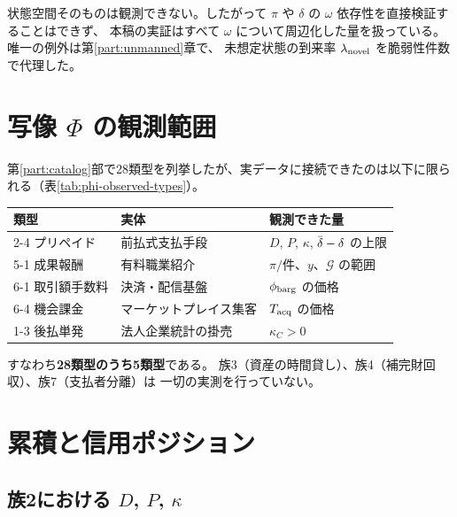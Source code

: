 \begin{remark}
状態空間そのものは観測できない。したがって
$\pi$ や $\delta$ の $\omega$ 依存性を直接検証することはできず、
本稿の実証はすべて $\omega$ について周辺化した量を扱っている。
唯一の例外は第\ref{part:unmanned}章で、
未想定状態の到来率 $\lambda_{\rm novel}$ を脆弱性件数で代理した。
\end{remark}

\section{写像 \texorpdfstring{$\Phi$}{Phi} の観測範囲}

第\ref{part:catalog}部で28類型を列挙したが、実データに接続できたのは以下に限られる（表\ref{tab:phi-observed-types}）。

\begin{center}
\begin{tabularx}{\textwidth}{@{}llX@{}}
\toprule
類型 & 実体 & 観測できた量 \\
\midrule
2-4 プリペイド & 前払式支払手段 & $D$, $P$, $\kappa$, $\dbar-\delta$ の上限 \\
5-1 成果報酬 & 有料職業紹介 & $\pi/$件、$y$、$\mathcal{G}$ の範囲 \\
6-1 取引額手数料 & 決済・配信基盤 & $\phi_{\rm barg}$ の価格 \\
6-4 機会課金 & マーケットプレイス集客 & $T_{\rm acq}$ の価格 \\
1-3 後払単発 & 法人企業統計の掛売 & $\kappa_C>0$ \\
\bottomrule
\end{tabularx}
\label{tab:phi-observed-types}
\end{center}

すなわち\textbf{28類型のうち5類型}である。
族3（資産の時間貸し）、族4（補完財回収）、族7（支払者分離）は
一切の実測を行っていない。

\section{累積と信用ポジション}

\subsection{族2における \texorpdfstring{$D$}{D}, \texorpdfstring{$P$}{P}, \texorpdfstring{$\kappa$}{kappa}}

